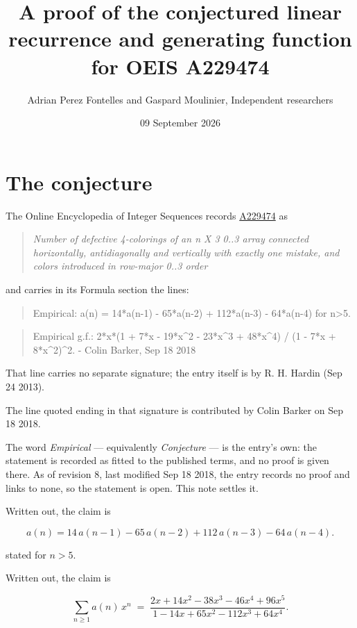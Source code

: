 \documentclass[11pt]{article}
\title{A proof of the conjectured linear recurrence and generating function for OEIS A229474}
\author{Adrian Perez Fontelles and Gaspard Moulinier, Independent researchers}
\date{09 September 2026}
\theoremstyle{definition}
\begin{document}
\maketitle
\section{The conjecture}

The Online Encyclopedia of Integer Sequences records \href{https://oeis.org/A229474}{A229474} as

\begin{quote}\itshape Number of defective 4-colorings of an n X 3 0..3 array connected horizontally, antidiagonally and vertically with exactly one mistake, and colors introduced in row-major 0..3 order\end{quote}

and carries in its Formula section the lines:

\begin{quote}\ttfamily Empirical: a(n) = 14*a(n-1) - 65*a(n-2) + 112*a(n-3) - 64*a(n-4) for n>5.\end{quote}

\begin{quote}\ttfamily Empirical g.f.: 2*x*(1 + 7*x - 19*x\textasciicircum{}2 - 23*x\textasciicircum{}3 + 48*x\textasciicircum{}4) / (1 - 7*x + 8*x\textasciicircum{}2)\textasciicircum{}2. - Colin Barker, Sep 18 2018\end{quote}

That line carries no separate signature; the entry itself is by R. H. Hardin (Sep 24 2013).

The line quoted ending in that signature is contributed by Colin Barker on Sep 18 2018.

The word {\itshape Empirical} --- equivalently {\itshape Conjecture} --- is the entry's own: the statement is recorded as fitted to the published terms, and no proof is given there. As of revision 8, last modified Sep 18 2018, the entry records no proof and links to none, so the statement is open. This note settles it.

Written out, the claim is

\[a(n) = 14\,a(n-1) - 65\,a(n-2) + 112\,a(n-3) - 64\,a(n-4).\]

stated for $n > 5$.

Written out, the claim is

\[\sum_{n \ge 1} a(n)\,x^n \;=\; \frac{2x + 14x^{2} - 38x^{3} - 46x^{4} + 96x^{5}}{1 - 14x + 65x^{2} - 112x^{3} + 64x^{4}}.\]
\end{document}
